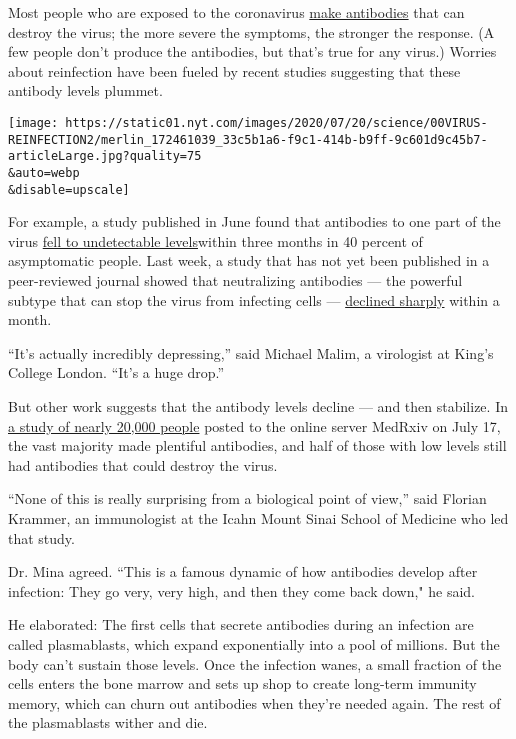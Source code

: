Most people who are exposed to the coronavirus
\href{https://www.nytimes.com/2020/05/07/health/coronavirus-antibody-prevalence.html}{make
antibodies} that can destroy the virus; the more severe the symptoms,
the stronger the response. (A few people don't produce the antibodies,
but that's true for any virus.) Worries about reinfection have been
fueled by recent studies suggesting that these antibody levels plummet.

\texttt{[image: https://static01.nyt.com/images/2020/07/20/science/00VIRUS-REINFECTION2/merlin\_172461039\_33c5b1a6-f9c1-414b-b9ff-9c601d9c45b7-articleLarge.jpg?quality=75\\\&auto=webp\\\&disable=upscale]}

For example, a study published in June found that antibodies to one part
of the virus
\href{https://www.nytimes.com/2020/06/18/health/coronavirus-antibodies.html}{fell
to undetectable levels}within three months in 40 percent of asymptomatic
people. Last week, a study that has not yet been published in a
peer-reviewed journal showed that neutralizing antibodies --- the
powerful subtype that can stop the virus from infecting cells ---
\href{https://www.medrxiv.org/content/10.1101/2020.07.09.20148429v1}{declined
sharply} within a month.

``It's actually incredibly depressing,'' said Michael Malim, a
virologist at King's College London. ``It's a huge drop.''

But other work suggests that the antibody levels decline --- and then
stabilize. In
\href{https://www.medrxiv.org/content/10.1101/2020.07.14.20151126v1}{a
study of nearly 20,000 people} posted to the online server MedRxiv on
July 17, the vast majority made plentiful antibodies, and half of those
with low levels still had antibodies that could destroy the virus.

``None of this is really surprising from a biological point of view,''
said Florian Krammer, an immunologist at the Icahn Mount Sinai School of
Medicine who led that study.

Dr. Mina agreed. ``This is a famous dynamic of how antibodies develop
after infection: They go very, very high, and then they come back down,"
he said.

He elaborated: The first cells that secrete antibodies during an
infection are called plasmablasts, which expand exponentially into a
pool of millions. But the body can't sustain those levels. Once the
infection wanes, a small fraction of the cells enters the bone marrow
and sets up shop to create long-term immunity memory, which can churn
out antibodies when they're needed again. The rest of the plasmablasts
wither and die.

